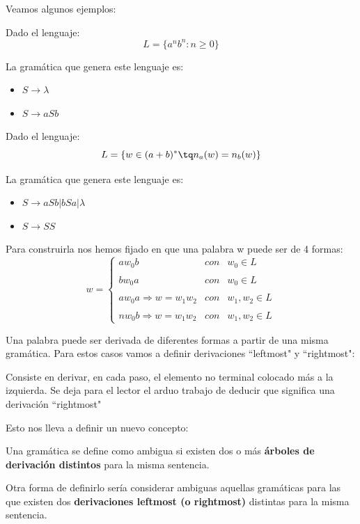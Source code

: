\documentclass{apuntes}
\begin{document}
Veamos algunos ejemplos:

\begin{example}
Dado el lenguaje:
\[L = \lbrace a^n b^n : n\geq 0 \rbrace\]

La gramática que genera este lenguaje es:
\begin{itemize}
\item $S \rightarrow \lambda$
\item $S \rightarrow aSb$
\end{itemize}
\end{example}

\begin{example}
Dado el lenguaje:
\[L = \lbrace w \in (a+b)^* \tq n_a(w)=n_b(w)\rbrace\]

La gramática que genera este lenguaje es:
\begin{itemize}
\item $S \rightarrow aSb | bSa | \lambda$
\item $S \rightarrow SS$
\end{itemize}

Para construirla nos hemos fijado en que una palabra w puede ser de 4 formas:
\[w = \left\{ \begin{array}{lcc}
             aw_0b &   con  & w_0 \in L \\
             \\ bw_0a &  con & w_0 \in L \\
             \\ aw_0a  \Rightarrow  w = w_1w_2  & con  & w_1,w_2 \in L\\
             \\ nw_0b  \Rightarrow  w = w_1w_2  &  con &  w_1,w_2 \in L
             \end{array}
   \right.\]
\end{example}

Una palabra puede ser derivada de diferentes formas a partir de una misma gramática. Para estos casos vamos a definir derivaciones ``leftmost" y ``rightmost":

\begin{defn}[Leftmost]
Consiste en derivar, en cada paso, el elemento no terminal colocado más a la izquierda. Se deja para el lector el arduo trabajo de deducir que significa una derivación ``rightmost"
\end{defn}

Esto nos lleva a definir un nuevo concepto:

\begin{defn}[Ambigüedad]
Una gramática se define como ambigua si existen dos o más \textbf{árboles de derivación distintos} para la misma sentencia.

Otra forma de definirlo sería considerar ambiguas aquellas gramáticas para las que existen dos \textbf{derivaciones leftmost (o rightmost)} distintas para la misma sentencia.
\end{defn}
\end{document}
